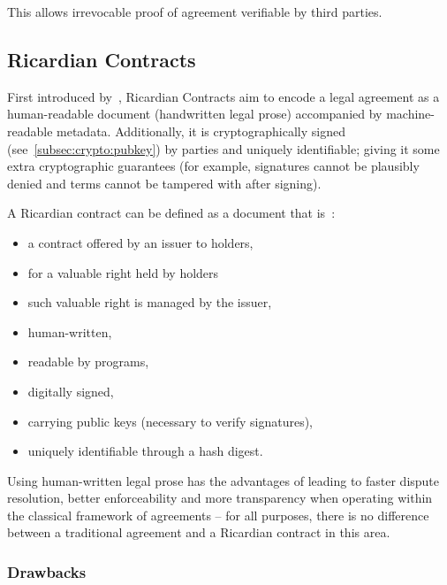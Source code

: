 This allows irrevocable proof of agreement verifiable by third parties.

\subsection{Ricardian Contracts}\label{subsec:ricardian-contracts}

First introduced by~\cite{grigg2004ricardian, ricardianWeb}, Ricardian Contracts aim to encode a legal agreement as a human-readable document (handwritten legal prose) accompanied by machine-readable metadata.
Additionally, it is cryptographically signed (see~\autoref{subsec:crypto:pubkey}) by parties and uniquely identifiable;
giving it some extra cryptographic guarantees (for example, signatures cannot be plausibly denied and terms cannot be tampered with after signing).


\begin{definition}
    \label{def:ricardian}
    A Ricardian contract can be defined as a document that is~\cite[]{grigg2004ricardian}:
    \begin{itemize}
        \item a contract offered by an issuer to holders,
        \item for a valuable right held by holders
        \item such valuable right is managed by the issuer,
        \item human-written,
        \item readable by programs,
        \item digitally signed,
        \item carrying public keys (necessary to verify signatures),
        \item uniquely identifiable through a hash digest.
    \end{itemize}
\end{definition}

Using human-written legal prose has the advantages of leading to faster dispute resolution, better enforceability and more transparency when operating within the classical framework of agreements -- for all purposes, there is no difference between a traditional agreement and a Ricardian contract in this area.

\subsubsection{Drawbacks}


